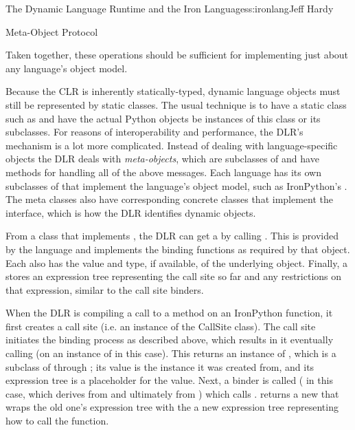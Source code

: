 \begin{aosachapter}{The Dynamic Language Runtime and the Iron Languages}{s:ironlang}{Jeff Hardy}
\begin{aosasect1}{Meta-Object Protocol}
\begin{aosaitemize}
\end{aosaitemize}

Taken together, these operations should be sufficient for implementing
just about any language's object model.

Because the CLR is inherently statically-typed, dynamic language
objects must still be represented by static classes. The usual
technique is to have a static class such as  and
have the actual Python objects be instances of this class or its
subclasses. For reasons of interoperability and performance, the DLR's
mechanism is a lot more complicated. Instead of dealing with
language-specific objects the DLR deals with \emph{meta-objects},
which are subclasses of  and
have methods for handling all of the above messages. Each language has
its own subclasses of  that implement the
language's object model, such as IronPython's
. The meta classes also have corresponding
concrete classes that implement the
 interface, which is
how the DLR identifies dynamic objects.


From a class that implements , the
DLR can get a  by calling
. This  is provided by
the language and implements the binding functions as required by that
object. Each  also has the value and type, if
available, of the underlying object. Finally, a
 stores an expression tree representing the
call site so far and any restrictions on that expression, similar to
the call site binders.

When the DLR is compiling a call to a method on an IronPython
function, it first creates a call site (i.e. an instance of the
CallSite class). The call site initiates the binding process as
described above, which results in it eventually calling
 (on an instance of  in
this case). This returns an instance of ,
which is a subclass of  through
; its value is the 
instance it was created from, and its expression tree is a placeholder
for the value. Next, a binder is called
( in this case, which derives from
 and ultimately from
) which calls
.  returns a
new  that wraps the old one's expression tree
with the a new expression tree representing how to call the function.


\end{aosasect1}
\end{aosachapter}
